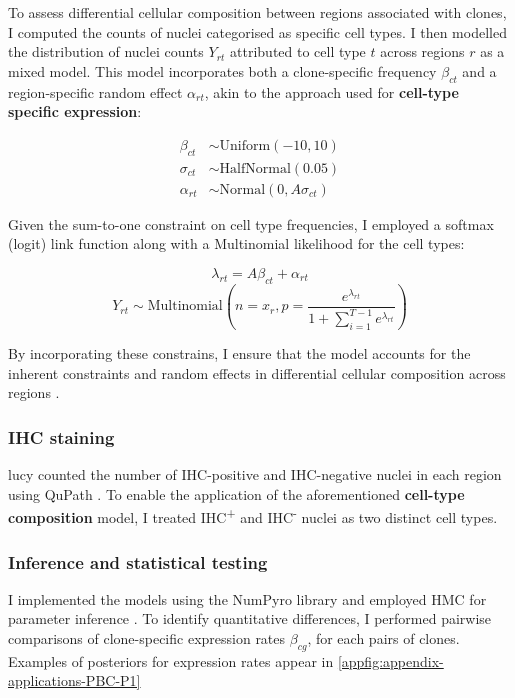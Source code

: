 To assess differential cellular composition between regions associated with clones, I computed the counts of nuclei categorised as specific cell types. I then modelled the distribution of nuclei counts $Y_{rt}$ attributed to cell type $t$ across regions $r$ as a mixed model. This model incorporates both a clone-specific frequency $\beta_{ct}$ and a region-specific random effect $\alpha_{rt}$, akin to the approach used for \textbf{cell-type specific expression}:

\begin{align}
\beta_{ct} &\sim \text{Uniform}(-10, 10) \\
\sigma_{ct} &\sim \text{HalfNormal}(0.05) \\
\alpha_{rt} &\sim \text{Normal}(0, A\sigma_{ct})
\end{align}

Given the sum-to-one constraint on cell type frequencies, I employed a softmax (logit) link function along with a Multinomial likelihood for the cell types:

\begin{equation}
\lambda_{rt} = A\beta_{ct} + \alpha_{rt}
\end{equation}
\begin{equation}
Y_{rt} \sim \text{Multinomial}\left(n=x_r, p=\frac{e^{\lambda_{rt}}}{1 + \sum_{i=1}^{T-1} e^{\lambda_{rt}}}\right)
\end{equation}

By incorporating these constrains, I ensure that the model accounts for the inherent constraints and random effects in differential cellular composition across regions .

\subsubsection*{IHC staining}
\ac{lucy} counted the number of IHC-positive and IHC-negative nuclei in each region using QuPath \parencite{Bankhead2017-px}. To enable the application of the aforementioned \textbf{cell-type composition} model, I treated IHC\textsuperscript{+} and IHC\textsuperscript{-} nuclei as two distinct cell types.

\subsubsection*{Inference and statistical testing}

I implemented the models using the \ac{NumPyro} library and employed \acf{HMC} for parameter inference . To identify quantitative differences, I performed pairwise comparisons of clone-specific expression rates $\beta_{cg}$, for each pairs of clones. Examples of posteriors for expression rates appear in \cref{appfig:appendix-applications-PBC-P1}

